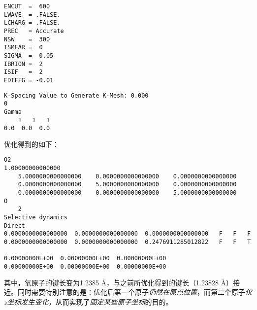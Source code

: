 \begin{lstlisting}[caption=INCAR]
ENCUT  =  600
LWAVE  = .FALSE.
LCHARG = .FALSE.
PREC   = Accurate
NSW    =  300
ISMEAR =  0
SIGMA  =  0.05
IBRION =  2
ISIF   =  2
EDIFFG = -0.01
\end{lstlisting}

\begin{lstlisting}[caption=KPOINTS]
K-Spacing Value to Generate K-Mesh: 0.000
0
Gamma
    1   1   1
0.0  0.0  0.0
\end{lstlisting}

优化得到的如下：

\begin{lstlisting}[caption=CONTCAR]
O2                                      
1.00000000000000     
    5.0000000000000000    0.0000000000000000    0.0000000000000000
    0.0000000000000000    5.0000000000000000    0.0000000000000000
    0.0000000000000000    0.0000000000000000    5.0000000000000000
O 
    2
Selective dynamics
Direct
0.0000000000000000  0.0000000000000000  0.0000000000000000   F   F   F
0.0000000000000000  0.0000000000000000  0.2476911285012822   F   F   T

0.00000000E+00  0.00000000E+00  0.00000000E+00
0.00000000E+00  0.00000000E+00  0.00000000E+00
\end{lstlisting}

其中，氧原子的键长变为1.2385 Å，与之前所优化得到的键长（1.23828 Å）接近。同时需要特别注意的是：优化后第一个原子\emph{仍然在原点位置}，而第二个原子\emph{仅$z$坐标发生变化}，从而实现了\emph{固定某些原子坐标}的目的。